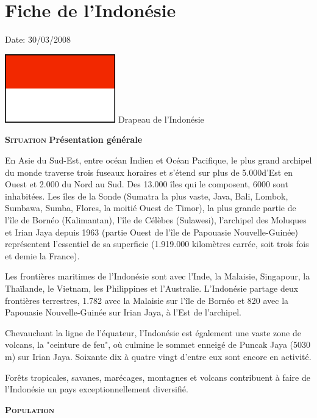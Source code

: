 \section{Fiche de l'Indonésie}

Date: 30/03/2008

\begin{multicols}{2}
\hspace*{-0.65cm}
\includegraphics[width=4.8cm]{articles/Fiche-de-l-indonesie/drapeauindonesie.png}
Drapeau de l'Indonésie

\textbf{\textsc{Situation}}
\textbf{Présentation générale}

En Asie du Sud-Est, entre océan Indien et Océan Pacifique, le plus grand archipel du monde traverse trois fuseaux horaires et s'étend sur plus de 5.000\kilo\meter\squared d'Est en Ouest et 2.000 \kilo\meter\squared du Nord au Sud. Des 13.000 îles qui le composent, 6000 sont inhabitées. Les îles de la Sonde (Sumatra la plus vaste, Java, Bali, Lombok, Sumbawa, Sumba, Flores, la moitié Ouest de Timor), la plus grande partie de l'île de Bornéo (Kalimantan), l'île de Célèbes (Sulawesi), l'archipel des Moluques et Irian Jaya depuis 1963 (partie Ouest de l'île de Papouasie Nouvelle-Guinée) représentent l'essentiel de sa superficie (1.919.000 kilomètres carrée, soit trois fois et demie la France).

Les frontières maritimes de l'Indonésie sont avec l'Inde, la Malaisie, Singapour, la Thaïlande, le Vietnam, les Philippines et l'Australie. L'Indonésie partage deux frontières terrestres, 1.782 \kilo\meter\squared avec la Malaisie sur l'île de Bornéo et 820 \kilo\meter\squared avec la Papouasie Nouvelle-Guinée sur Irian Jaya, à l'Est de l'archipel.

Chevauchant la ligne de l'équateur, l'Indonésie est également une vaste zone de volcans, la "ceinture de feu", où culmine le sommet enneigé de Puncak Jaya (5030 m) sur Irian Jaya. Soixante dix à quatre vingt d'entre eux sont encore en activité.

Forêts tropicales, savanes, marécages, montagnes et volcans contribuent à faire de l'Indonésie un pays exceptionnellement diversifié.

\textbf{\textsc{Population}}


\end{multicols}
